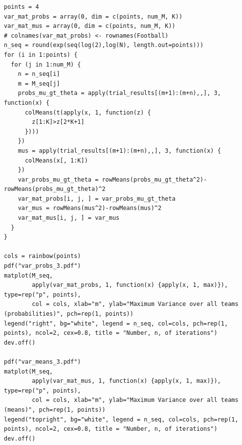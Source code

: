 \documentclass[11pt]{article} %
\begin{document}
\begin{lstlisting}
points = 4
var_mat_probs = array(0, dim = c(points, num_M, K))
var_mat_mus = array(0, dim = c(points, num_M, K))
# colnames(var_mat_probs) <- rownames(Football)
n_seq = round(exp(seq(log(2),log(N), length.out=points)))
for (i in 1:points) {
  for (j in 1:num_M) {
    n = n_seq[i]
    m = M_seq[j]
    probs_mu_gt_theta = apply(trial_results[(m+1):(m+n),,], 3, function(x) {
      colMeans(t(apply(x, 1, function(z) {
        z[1:K]>z[2*K+1]
      })))
    })
    mus = apply(trial_results[(m+1):(m+n),,], 3, function(x) {
      colMeans(x[, 1:K])
    })
    var_probs_mu_gt_theta = rowMeans(probs_mu_gt_theta^2)-rowMeans(probs_mu_gt_theta)^2
    var_mat_probs[i, j, ] = var_probs_mu_gt_theta
    var_mus = rowMeans(mus^2)-rowMeans(mus)^2
    var_mat_mus[i, j, ] = var_mus
  }
}

cols = rainbow(points)
pdf("var_probs_3.pdf")
matplot(M_seq, 
        apply(var_mat_probs, 1, function(x) {apply(x, 1, max)}), type=rep("p", points),
        col = cols, xlab="m", ylab="Maximum Variance over all teams (probabilities)", pch=rep(1, points))
legend("right", bg="white", legend = n_seq, col=cols, pch=rep(1, points), ncol=2, cex=0.8, title = "Number, n, of iterations")
dev.off()

pdf("var_means_3.pdf")
matplot(M_seq, 
        apply(var_mat_mus, 1, function(x) {apply(x, 1, max)}), type=rep("p", points),
        col = cols, xlab="m", ylab="Maximum Variance over all teams (means)", pch=rep(1, points))
legend("topright", bg="white", legend = n_seq, col=cols, pch=rep(1, points), ncol=2, cex=0.8, title = "Number, n, of iterations")
dev.off()
\end{lstlisting}
\end{document}
